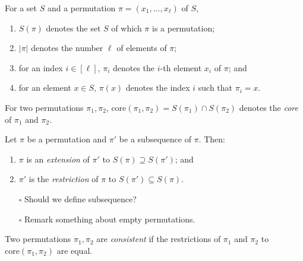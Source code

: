 \documentclass[fontsize=11pt,paper=a4]{book}
\begin{document}
\begin{notation}
For a set \(S\) and a permutation \(\pi=(x_1,\dots,x_{\ell})\) of \(S\),

\begin{enumerate}
\item \label{itm:notation-permutation-1}
\(S(\pi)\) denotes the set \(S\) of which \(\pi\) is a permutation;

\item \label{itm:notation-permutation-2}
\(\lvert\pi\rvert\) denotes the number \(\ell\) of elements of \(\pi\);

\item \label{itm:notation-permutation-3}
for an index \(i\in[\ell]\), \(\pi_i\) denotes the \(i\)-th element \(x_i\) of \(\pi\); and

\item \label{itm:notation-permutation-4}
for an element \(x\in S\), \(\pi(x)\) denotes the index \(i\) such that \(\pi_i=x\).
\end{enumerate}
\label{orga3cd559}
\end{notation}

\begin{notation}
For two permutations \(\pi_1,\pi_2\), \(\mathrm{core}(\pi_1,\pi_2)=S(\pi_1)\cap S(\pi_2)\) denotes the \emph{core} of \(\pi_1\) and \(\pi_2\).
\label{org4852a00}
\end{notation}

\begin{defn}
Let \(\pi\) be a permutation and \(\pi'\) be a subsequence of \(\pi\). Then:

\begin{enumerate}
\item \(\pi\) is an \emph{extension} of \(\pi'\) to \(S(\pi)\supseteq S(\pi')\); and

\item \(\pi'\) is the \emph{restriction} of \(\pi\) to \(S(\pi')\subseteq S(\pi)\).
\end{enumerate}
\label{org141d491}
\end{defn}

\begin{itemize}
\item[{$\square$}] Should we define subsequence?
\item[{$\square$}] Remark something about empty permutations.
\end{itemize}

\begin{defn}
Two permutations \(\pi_1,\pi_2\) are \emph{consistent} if the restrictions of \(\pi_1\) and \(\pi_2\) to \(\mathrm{core}(\pi_1,\pi_2)\) are equal.
\label{orgc384963}
\end{defn}
\end{document}

